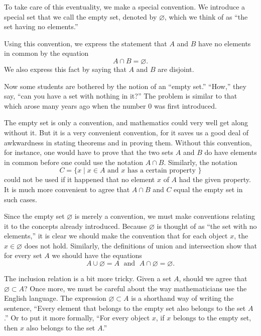 To take care of this eventuality, we make a special convention. 
We introduce a special set that we call the empty set, 
denoted by \(\varnothing\), which we think of as ``the set having no elements.''

Using this convention, we express the statement that \(A\) and \(B\) have no elements in common by the equation
\[
A \cap B = \varnothing \text{.}
\]
We also express this fact by saying that \(A\) and \(B\) are disjoint.

Now some students are bothered by the notion of an ``empty set.'' ``How,'' they say, 
``can you have a set with nothing in it?'' 
The problem is similar to that which arose many years ago when the number 0 was first introduced.

The empty set is only a convention, and mathematics could very well get along without it. 
But it is a very convenient convention, for it saves us a good deal of awkwardness in stating theorems and in proving them. 
Without this convention, for instance, one would have to prove 
that the two sets \(A\) and \(B\) do have elements in common before one could use the notation 
\(A \cap B\). Similarly, the notation
\[
C = \{ x \mid x \in A\text{ and }x\text{ has a certain property }\}
\]
could not be used if it happened that no element \(x\) of \(A\) had the given property.
It is much more convenient to agree that \(A \cap B\) and \(C\) equal the empty set in such cases.

Since the empty set \(\varnothing\) is merely a convention, 
we must make conventions relating it to the concepts already introduced. 
Because \(\varnothing\) is thought of as ``the set with no elements,'' 
it is clear we should make the convention that for each object \(x\), 
the  \(x \in \varnothing\) does not hold. 
Similarly, the definitions of union and intersection show that for every set \(A\) 
we should have the equations
\[
A \cup \varnothing = A\;\text{ and }\;A \cap \varnothing = \varnothing .
\]

The inclusion relation is a bit more tricky. 
Given a set \(A\), should we agree that \(\varnothing \subset A\)? 
Once more, we must be careful about the way mathematicians use the English language. 
The expression \(\varnothing \subset A\) is a shorthand way of writing the sentence, 
``Every element that belongs to the empty set also belongs to the set \(A\).'' Or to put it more formally, ``For every object \(x\), if \(x\) belongs to the empty set, 
then \(x\) also belongs to the set \(A\).''

